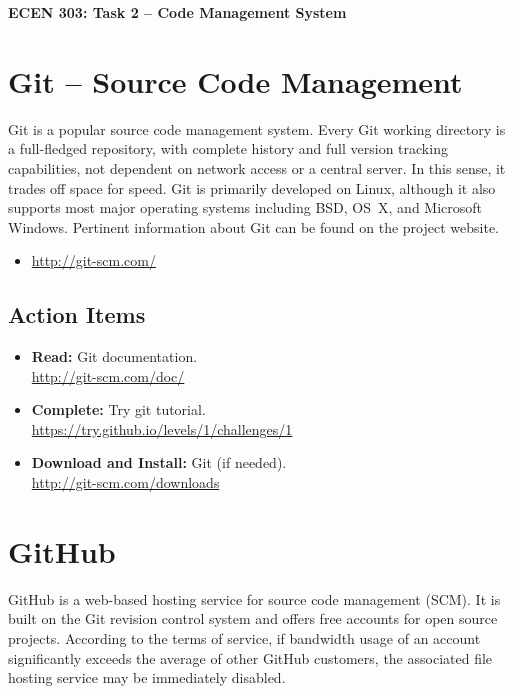 \documentclass[11pt]{article}
\begin{document}
\begin{center}
{\bfseries \LARGE ECEN 303: Task 2 -- Code Management System\\[8mm]}
\end{center}


\section{Git -- Source Code Management}

Git is a popular source code management system.
Every Git working directory is a full-fledged repository, with complete history and full version tracking capabilities, not dependent on network access or a central server.
In this sense, it trades off space for speed.
Git is primarily developed on Linux, although it also supports most major operating systems including BSD, OS~X, and Microsoft Windows.
Pertinent information about Git can be found on the project website.
\begin{itemize}
\item \url{http://git-scm.com/}
\end{itemize}


\subsection*{Action Items}

\begin{itemize}
\item \textbf{Read:} Git documentation. \\
\url{http://git-scm.com/doc/}
\item \textbf{Complete:} Try git tutorial. \\
\url{https://try.github.io/levels/1/challenges/1}
\item \textbf{Download and Install:} Git (if needed). \\
\url{http://git-scm.com/downloads}
\end{itemize}


\section{GitHub}

GitHub is a web-based hosting service for source code management (SCM).
It is built on the Git revision control system and offers free accounts for open source projects.
According to the terms of service, if bandwidth usage of an account significantly exceeds the average of other GitHub customers, the associated file hosting service may be immediately disabled.
\end{document}
